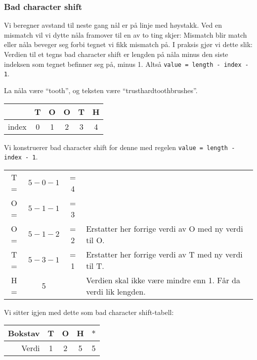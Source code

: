 	\subsubsection{Bad character shift}
		Vi beregner avstand til neste gang nål er på linje med høystakk.
		Ved en mismatch vil vi dytte nåla framover til en av to ting skjer: Mismatch blir match eller nåla beveger seg forbi tegnet vi fikk mismatch på.
		I praksis gjør vi dette slik: Verdien til et tegns bad character shift er lengden på nåla minus den siste indeksen som tegnet befinner seg på, minus 1. Altså \verb|value = length - index - 1|.
		
		\begin{eks}
		La nåla være ``tooth'', og teksten være ``trusthardtoothbrushes''.
		
		\begin{center}
			\begin{tabular}{r | c c c c c}
				& T & O & O & T & H \\ \hline
				index & 0 & 1 & 2 & 3 & 4
			\end{tabular}
		\end{center}

		Vi konstruerer bad character shift for denne med regelen \verb|value = length - index - 1|.

\begin{center}
\begin{tabular}{cccl}
T = & $5-0-1$&= 4\\
O = & $5-1-1$&= 3\\
O = & $5-1-2$&= 2&Erstatter her forrige verdi av O med ny verdi til O.\\
T = &$5-3-1$& = 1&Erstatter her forrige verdi av T med ny verdi til T.\\
H = &5 &&Verdien skal ikke være mindre enn 1. Får da verdi lik lengden.\\
\end{tabular}

Vi sitter igjen med dette som bad character shift-tabell: \newline
\begin{tabular}{r|cccc}
Bokstav&T&O&H&$*$\\
\hline
Verdi&1&2&5&5\\
\end{tabular}
\end{center}


\end{eks}

